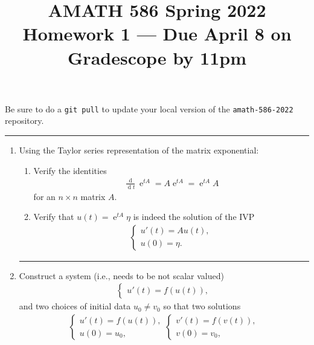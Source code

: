 \documentclass[10pt]{amsart}
\DeclareMathOperator{\D}{d}
\DeclareMathOperator{\E}{e}
\begin{document}
\pagestyle{empty}

\newcommand{\mline}{\vspace{.2in}\hrule\vspace{.2in}}


\title{\bf { AMATH 586 Spring 2022 \\ Homework 1 ---
Due April 8 on Gradescope by 11pm} }
\maketitle
\centerline{Be sure to do a {\tt git pull} to update your local version of the {\tt amath-586-2022} repository.}

\mline
\begin{enumerate}[label={\bf Problem~{\arabic*}:}]
  \item Using the Taylor series representation of the matrix exponential:
  \begin{enumerate}
\item Verify the identities
  \begin{align*}
    \frac{\D}{\D t} \E^{t A} = A \E^{t A} = \E^{t A} A
  \end{align*}
  for an $n\times n$ matrix $A$.
\item Verify that $u(t) = \E^{t A} \eta$ is indeed the solution of the IVP
  \begin{align*}
    \begin{cases}
      u'(t) = A u(t),\\
      u(0) = \eta.
    \end{cases}
  \end{align*}
\end{enumerate}
\mline
\item Construct a system (i.e., needs to be not scalar valued)
  \begin{align*}
    \begin{cases}
      u'(t) = f(u(t)),
    \end{cases}
  \end{align*}
  and two choices of initial data $u_0 \neq v_0$ so that two solutions
  \begin{align*}
    \begin{cases}
      u'(t) = f(u(t)),\\
      u(0) = u_0,
    \end{cases}
    \begin{cases}
      v'(t) = f(v(t)),\\
      v(0) = v_0,
    \end{cases}

\end{align*}
\end{enumerate}
\end{document}
